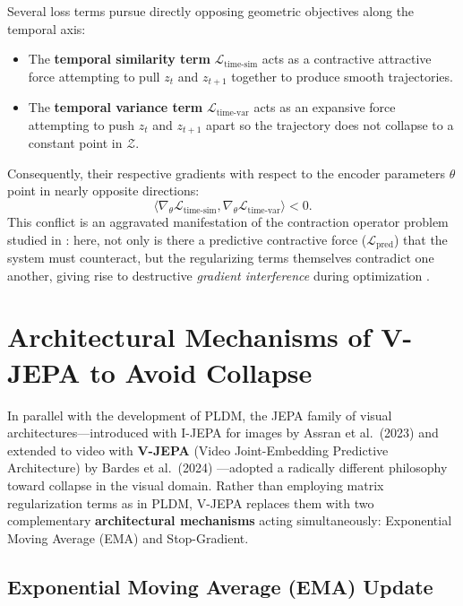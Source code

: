 \documentclass[11pt, oneside, openany]{book}
\begin{document}
Several loss terms pursue directly opposing geometric objectives along the temporal axis:
\begin{itemize}
    \item The \textbf{temporal similarity term} $\mathcal{L}_{\text{time-sim}}$ acts as a contractive attractive force attempting to pull $z_{t}$ and $z_{t+1}$ together to produce smooth trajectories.
    \item The \textbf{temporal variance term} $\mathcal{L}_{\text{time-var}}$ acts as an expansive force attempting to push $z_{t}$ and $z_{t+1}$ apart so the trajectory does not collapse to a constant point in $\mathcal{Z}$.
\end{itemize}
Consequently, their respective gradients with respect to the encoder parameters $\theta$ point in nearly opposite directions:
\begin{equation}
\label{eq:6.7}
\langle \nabla_{\theta} \mathcal{L}_{\text{time-sim}}, \nabla_{\theta} \mathcal{L}_{\text{time-var}} \rangle < 0.
\end{equation}
This conflict is an aggravated manifestation of the contraction operator problem studied in : here, not only is there a predictive contractive force ($\mathcal{L}_{\text{pred}}$) that the system must counteract, but the regularizing terms themselves contradict one another, giving rise to destructive \textit{gradient interference} during optimization \cite{yu2020gradient}.

\section{Architectural Mechanisms of V-JEPA to Avoid Collapse}
\label{sec:6.4}

In parallel with the development of PLDM, the JEPA family of visual architectures---introduced with I-JEPA for images by Assran et al.\ (2023) \cite{assran2023self} and extended to video with \textbf{V-JEPA} (Video Joint-Embedding Predictive Architecture) by Bardes et al.\ (2024) \cite{bardes2024revisiting}---adopted a radically different philosophy toward collapse in the visual domain. Rather than employing matrix regularization terms as in PLDM, V-JEPA replaces them with two complementary \textbf{architectural mechanisms} acting simultaneously: Exponential Moving Average (EMA) and Stop-Gradient.

\subsection{Exponential Moving Average (EMA) Update}
\label{sec:6.4.1}
\end{document}
